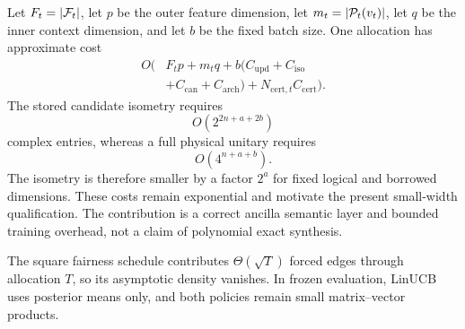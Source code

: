 Let $F_t=|\mathcal{F}_t|$, let $p$ be the outer feature dimension, let $m_t=|\mathcal{P}_t(v_t)|$, let $q$ be the inner context dimension, and let $b$ be the fixed batch size. One allocation has approximate cost
\begin{equation}
\begin{aligned}
O\!\bigl(&F_tp+m_tq
+b(C_{\mathrm{upd}}+C_{\mathrm{iso}}\\
&+C_{\mathrm{can}}+C_{\mathrm{arch}})
+N_{\mathrm{cert},t}C_{\mathrm{cert}}\bigr).
\end{aligned}
\label{eq:allocation-cost}
\end{equation}
The stored candidate isometry requires
\begin{equation}
O\!\left(2^{2n+a+2b}\right)
\end{equation}
complex entries, whereas a full physical unitary requires
\begin{equation}
O\!\left(4^{n+a+b}\right).
\end{equation}
The isometry is therefore smaller by a factor $2^a$ for fixed logical and borrowed dimensions. These costs remain exponential and motivate the present small-width qualification. The contribution is a correct ancilla semantic layer and bounded training overhead, not a claim of polynomial exact synthesis.

The square fairness schedule contributes $\Theta(\sqrt T)$ forced edges through allocation $T$, so its asymptotic density vanishes. In frozen evaluation, LinUCB uses posterior means only, and both policies remain small matrix--vector products.
